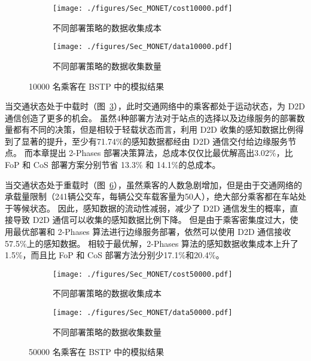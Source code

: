 \begin{figure}[!b]
  \vspace{-1em}
  \centering
  \begin{subfigure}[b]{0.45\linewidth}
    \texttt{[image: ./figures/Sec\_MONET/cost10000.pdf]}
    \label{fig_cost10000}
    \vspace{-2em}
    \caption{不同部署策略的数据收集成本}
  \end{subfigure}
  \begin{subfigure}[b]{0.45\linewidth}
    \texttt{[image: ./figures/Sec\_MONET/data10000.pdf]}
    \label{fig_data10000}
    \vspace{-2em}
    \caption{不同部署策略的数据收集数量}
  \end{subfigure}
    \vspace{-0.5em}
    \caption{10000 名乘客在 BSTP 中的模拟结果}
  \label{fig_10000}
  \vspace{-1em}
\end{figure}
当交通状态处于中载时（图~\ref{fig_10000}），此时交通网络中的乘客都处于运动状态，为 D2D 通信创造了更多的机会。
虽然4种部署方法对于站点的选择以及边缘服务的部署数量都有不同的决策，但是相较于轻载状态而言，利用 D2D 收集的感知数据比例得到了显著的提升，至少有71.74\%的感知数据都经由 D2D 通信交付给边缘服务节点。
而本章提出 2-Phases 部署决策算法，总成本仅仅比最优解高出3.02\%，比 FoP 和 CoS 部署方案分别节省 13.3\% 和 14.1\%的总成本。

当交通状态处于重载时（图~\ref{fig_50000}），虽然乘客的人数急剧增加，但是由于交通网络的承载量限制（241辆公交车，每辆公交车载客量为50人），绝大部分乘客都在车站处于等候状态。
因此，感知数据的流动性减弱，减少了 D2D 通信发生的概率，直接导致 D2D 通信可以收集的感知数据比例下降。
但是由于乘客密集度过大，使用最优部署和 2-Phases 算法进行边缘服务部署，依然可以使用 D2D 通信接收57.5\%上的感知数据。
相较于最优解，2-Phases 算法的感知数据收集成本上升了1.5\%，而且比 FoP 和 CoS 部署方法分别少17.1\%和20.4\%。

\begin{figure}[!h]
  \vspace{-1em}
  \centering
  \begin{subfigure}[b]{0.45\linewidth}
    \texttt{[image: ./figures/Sec\_MONET/cost50000.pdf]}
    \label{fig_cost50000}
    \vspace{-2em}
    \caption{不同部署策略的数据收集成本}
  \end{subfigure}
  \begin{subfigure}[b]{0.45\linewidth}
    \texttt{[image: ./figures/Sec\_MONET/data50000.pdf]}
    \label{fig_data50000}
    \vspace{-2em}
    \caption{不同部署策略的数据收集数量}
  \end{subfigure}
    \vspace{-0.5em}
    \caption{50000 名乘客在 BSTP 中的模拟结果}
  \label{fig_50000}
  \vspace{-2em}
\end{figure}


